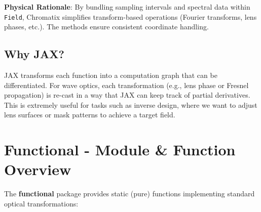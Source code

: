 \documentclass[a4paper,12pt]{report}
\begin{document}
\noindent\textbf{Physical Rationale}: By bundling sampling intervals and spectral data within \texttt{Field}, Chromatix simplifies transform-based operations (Fourier transforms, lens phases, etc.). The methods ensure consistent coordinate handling.

\subsection{Why JAX?}
JAX transforms each function into a computation graph that can be differentiated. For wave optics, each transformation (e.g., lens phase or Fresnel propagation) is re-cast in a way that JAX can keep track of partial derivatives. This is extremely useful for tasks such as inverse design, where we want to adjust lens surfaces or mask patterns to achieve a target field.

\section{Functional - Module \& Function Overview}
The \textbf{functional} package provides static (pure) functions implementing standard optical transformations:
\end{document}
